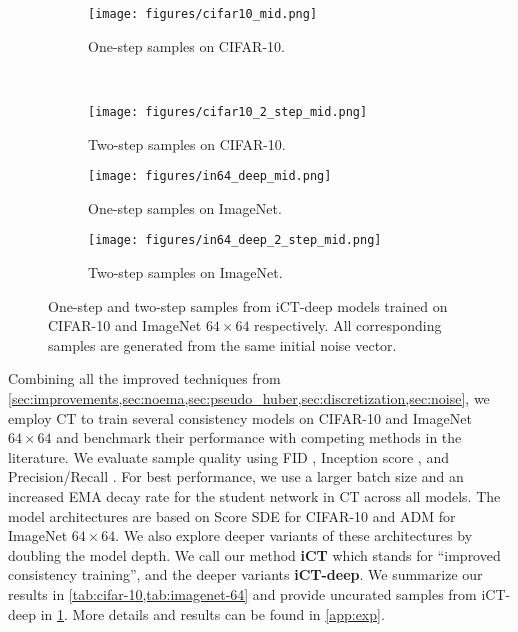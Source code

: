 \begin{figure}
    \centering
    \begin{minipage}[t]{0.33\textwidth}
        \vspace{-24.5em}
        \begin{subfigure}[b]{\linewidth}
            \centering
            \texttt{[image: figures/cifar10\_mid.png]}
            \caption{One-step samples on CIFAR-10.}
        \end{subfigure}\\
        \begin{subfigure}[b]{\linewidth}
            \centering
            \vspace{1.5em}
            \texttt{[image: figures/cifar10\_2\_step\_mid.png]}
            \caption{Two-step samples on CIFAR-10.}
        \end{subfigure}
    \end{minipage}\hfill
    \begin{subfigure}[b]{0.33\textwidth}
        \centering
        \texttt{[image: figures/in64\_deep\_mid.png]}
        \caption{One-step samples on ImageNet.}
    \end{subfigure}\hfill
    \begin{subfigure}[b]{0.33\textwidth}
        \centering
        \texttt{[image: figures/in64\_deep\_2\_step\_mid.png]}
        \caption{Two-step samples on ImageNet.}
    \end{subfigure}
    \caption{One-step and two-step samples from iCT-deep models trained on CIFAR-10 and ImageNet $64\times 64$ respectively. All corresponding samples are generated from the same initial noise vector.}\label{fig:samples}
\end{figure}

Combining all the improved techniques from \cref{sec:improvements,sec:noema,sec:pseudo_huber,sec:discretization,sec:noise}, we employ CT to train several consistency models on CIFAR-10 and ImageNet $64\times 64$ and benchmark their performance with competing methods in the literature. We evaluate sample quality using FID \citep{heusel2017gans}, Inception score \citep{SalimansGZCRCC16}, and Precision/Recall \citep{kynkaanniemi2019improved}. For best performance, we use a larger batch size and an increased EMA decay rate for the student network in CT across all models. The model architectures are based on Score SDE \citep{song2021scorebased} for CIFAR-10 and ADM \citep{dhariwal2021diffusion} for ImageNet $64\times 64$. We also explore deeper variants of these architectures by doubling the model depth. We call our method \textbf{iCT} which stands for ``improved consistency training'', and the deeper variants \textbf{iCT-deep}. We summarize our results in \cref{tab:cifar-10,tab:imagenet-64} and provide uncurated samples from iCT-deep in \cref{fig:samples}. More details and results can be found in \cref{app:exp}.

